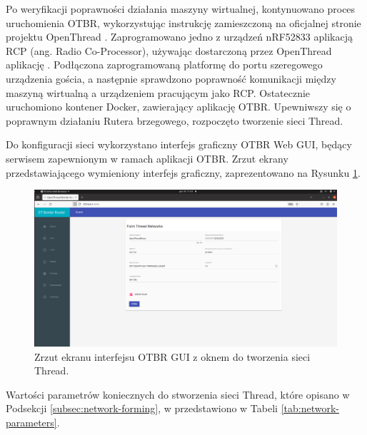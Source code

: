        Po weryfikacji poprawności działania maszyny wirtualnej, kontynuowano proces uruchomienia OTBR, wykorzystując instrukcję zamieszczoną na oficjalnej stronie projektu OpenThread \cite{otbr-docker}. Zaprogramowano jedno z urządzeń nRF52833 aplikacją RCP (ang. Radio Co-Processor), używając dostarczoną przez OpenThread aplikację \cite{otbr-rcp-app}. Podłączona zaprogramowaną platformę do portu szeregowego urządzenia gościa, a następnie sprawdzono poprawność komunikacji między maszyną wirtualną a urządzeniem pracującym jako RCP. Ostatecznie uruchomiono kontener Docker, zawierający aplikację OTBR. Upewniwszy się o poprawnym działaniu Rutera brzegowego, rozpoczęto tworzenie sieci Thread.
    
        Do konfiguracji sieci wykorzystano interfejs graficzny OTBR Web GUI, będący serwisem zapewnionym w ramach aplikacji OTBR. Zrzut ekrany przedstawiającego wymieniony interfejs graficzny, zaprezentowano na Rysunku \ref{fig:otbr-web-gui}.
        
        \begin{figure}[H]
            \centering
            \includegraphics[width=0.8\linewidth]{graphics/screenshots/OTBR-web-gui.png}
            \caption{Zrzut ekranu interfejsu OTBR GUI z oknem do tworzenia sieci Thread.}
            \label{fig:otbr-web-gui}
        \end{figure}
        
        Wartości parametrów koniecznych do stworzenia sieci Thread, które opisano w Podsekcji \ref{subsec:network-forming}, w  przedstawiono w Tabeli \ref{tab:network-parameters}.
    
